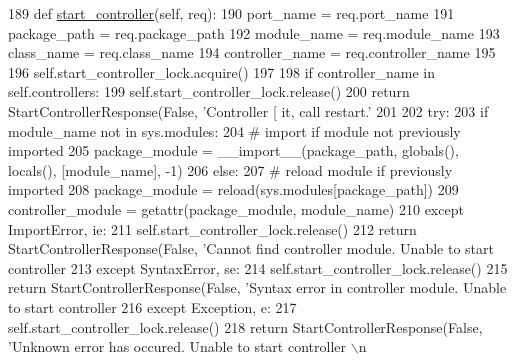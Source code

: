 \begin{DoxyCode}
189     \textcolor{keyword}{def }\hyperlink{namespacecontroller__spawner_a1bf65f27733e8e5fcb255dd8d369da6d}{start\_controller}(self, req):
190         port\_name = req.port\_name
191         package\_path = req.package\_path
192         module\_name = req.module\_name
193         class\_name = req.class\_name
194         controller\_name = req.controller\_name
195         
196         self.start\_controller\_lock.acquire()
197         
198         \textcolor{keywordflow}{if} controller\_name \textcolor{keywordflow}{in} self.controllers:
199             self.start\_controller\_lock.release()
200             \textcolor{keywordflow}{return} StartControllerResponse(\textcolor{keyword}{False}, \textcolor{stringliteral}{'Controller [%
       it, call restart.'} %
201             
202         \textcolor{keywordflow}{try}:
203             \textcolor{keywordflow}{if} module\_name \textcolor{keywordflow}{not} \textcolor{keywordflow}{in} sys.modules:
204                 \textcolor{comment}{# import if module not previously imported}
205                 package\_module = \_\_import\_\_(package\_path, globals(), locals(), [module\_name], -1)
206             \textcolor{keywordflow}{else}:
207                 \textcolor{comment}{# reload module if previously imported}
208                 package\_module = reload(sys.modules[package\_path])
209             controller\_module = getattr(package\_module, module\_name)
210         \textcolor{keywordflow}{except} ImportError, ie:
211             self.start\_controller\_lock.release()
212             \textcolor{keywordflow}{return} StartControllerResponse(\textcolor{keyword}{False}, \textcolor{stringliteral}{'Cannot find controller module. Unable to start
       controller %
213         \textcolor{keywordflow}{except} SyntaxError, se:
214             self.start\_controller\_lock.release()
215             \textcolor{keywordflow}{return} StartControllerResponse(\textcolor{keyword}{False}, \textcolor{stringliteral}{'Syntax error in controller module. Unable to start
       controller %
216         \textcolor{keywordflow}{except} Exception, e:
217             self.start\_controller\_lock.release()
218             \textcolor{keywordflow}{return} StartControllerResponse(\textcolor{keyword}{False}, \textcolor{stringliteral}{'Unknown error has occured. Unable to start controller %
      \(\backslash\)n%
}}}
\end{DoxyCode}
